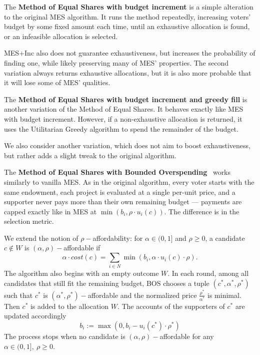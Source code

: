 \begin{definition}
The \textbf{Method of Equal Shares with budget increment} is a simple alteration to the original MES algorithm. It runs the method repeatedly, increasing voters' budget by some fixed amount each time, until an exhaustive allocation is found, or an infeasible allocation is selected.
\end{definition}
MES+Inc also does not guarantee exhaustiveness, but increases the probability of finding one, while likely preserving many of MES' properties. The second variation always returns exhaustive allocations, but it is also more probable that it will lose some of MES' qualities.
\begin{definition}
The \textbf{Method of Equal Shares with budget increment and greedy fill} is another variation of the Method of Equal Shares. It behaves exactly like MES with budget increment. However, if a non-exhaustive allocation is returned, it uses the Utilitarian Greedy algorithm to spend the remainder of the budget.
\end{definition}

We also consider another variation, which does not aim to boost exhaustiveness, but rather adds a slight tweak to the original algorithm.
\begin{definition}
The \textbf{Method of Equal Shares with Bounded Overspending}~\cite{BOS} works similarly to vanilla MES. As in the original algorithm, every voter starts with the same endowment, each project is evaluated at a single per-unit price, and a supporter never pays more than their own remaining budget --- payments are capped exactly like in MES at $\min(b_i, \rho\cdot u_i(c))$. The difference is in the selection metric.

We extend the notion of $\rho-$affordability: for $\alpha\in (0,1]$ and $\rho\ge 0$, a candidate $c\notin W$ is $(\alpha, \rho)-$affordable if
$$
\alpha\cdot cost(c)=\sum_{i\in N}\min(b_i, \alpha \cdot u_i(c)\cdot \rho).
$$
The algorithm also begins with an empty outcome $W$. In each round, among all candidates that still fit the remaining budget, BOS chooses a tuple $(c^*, \alpha^*, \rho^*)$ such that $c^*$ is $(\alpha^*, \rho^*)-$affordable and the normalized price $\frac{\rho^*}{\alpha^*}$ is minimal. Then $c^*$ is added to the allocation $W$. The accounts of the supporters of $c^*$ are updated accordingly
$$
b_i := \max(0, b_i-u_i(c^*)\cdot \rho^*)
$$
The process stops when no candidate is $(\alpha, \rho)-$affordable for any $\alpha\in(0,1], \ \rho\ge 0$.
\end{definition}


